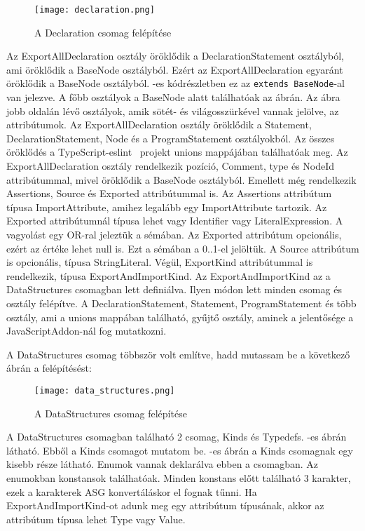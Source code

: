 \begin{figure}[!htbp]
      \caption{A Declaration csomag felépítése}\label{fig:declaration_vpp}
      \centering
      \texttt{[image: declaration.png]}
\end{figure}

Az ExportAllDeclaration osztály öröklődik a DeclarationStatement osztályból, ami öröklődik a BaseNode osztályból.
Ezért az ExportAllDeclaration egyaránt öröklődik a BaseNode osztályból.
-es kódrészletben ez az \texttt{extends BaseNode}-al van jelezve.
A főbb osztályok a BaseNode alatt találhatóak az ábrán.
Az ábra jobb oldalán lévő osztályok, amik sötét- és világosszürkével vannak jelölve, az attribútumok.
Az ExportAllDeclaration osztály öröklődik a Statement, DeclarationStatement, Node és a ProgramStatement osztályokból.
Az összes öröklődés a TypeScript-eslint~\cite{typescript-eslint} projekt unions mappájában találhatóak meg.
Az ExportAllDeclaration osztály rendelkezik pozíció, Comment, type és NodeId attribútummal, mivel öröklődik a BaseNode osztályból.
Emellett még rendelkezik Assertions, Source és Exported attribútummal is.
Az Assertions attribútum típusa ImportAttribute, amihez legalább egy ImportAttribute tartozik.
Az Exported attribútumnál típusa lehet vagy Identifier vagy LiteralExpression.
A vagyolást egy OR-ral jeleztük a sémában.
Az Exported attribútum opcionális, ezért az értéke lehet null is. Ezt a sémában a 0..1-el jelöltük.
A Source attribútum is opcionális, típusa StringLiteral.
Végül, ExportKind attribútummal is rendelkezik, típusa ExportAndImportKind.
Az ExportAndImportKind az a DataStructures csomagban lett definiálva.
Ilyen módon lett minden csomag és osztály felépítve.
A DeclarationStatement, Statement, ProgramStatement és több osztály, ami a unions mappában található, gyűjtő osztály, aminek a jelentősége a JavaScriptAddon-nál fog mutatkozni.


A DataStructures csomag többször volt említve, hadd mutassam be a következő ábrán a felépítésést:

\begin{figure}[!htbp]
      \caption{A DataStructures csomag felépítése}\label{fig:data_structures_kinds}
      \centering
      \texttt{[image: data\_structures.png]}
\end{figure}

A DataStructures csomagban található 2 csomag, Kinds és Typedefs. -es ábrán látható. Ebből a Kinds csomagot mutatom be.
-es ábrán a Kinds csomagnak egy kisebb része látható.
Enumok vannak deklarálva ebben a csomagban.
Az enumokban konstansok találhatóak. Minden konstans előtt található 3 karakter, ezek a karakterek ASG konvertáláskor el fognak tűnni.
Ha ExportAndImportKind-ot adunk meg egy attribútum típusának, akkor az attribútum típusa lehet Type vagy Value.


